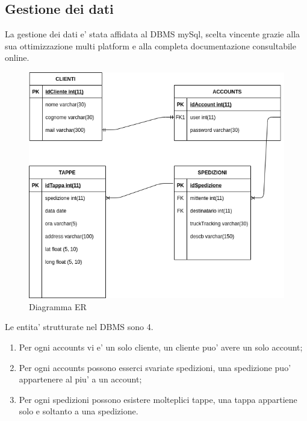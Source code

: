 \documentclass[a4paper, 12pt]{report}
\begin{document}
\subsection{Gestione dei dati}
La gestione dei dati e’ stata affidata al DBMS mySql, scelta vincente grazie alla sua ottimizzazione multi platform e alla completa documentazione consultabile online.
\begin{figure}[H]
    \centering
    \includegraphics[scale=0.5]{img/er.png}
    \caption{Diagramma ER}
    \label{fig:my_label}
\end{figure}
Le entita’ strutturate nel DBMS sono 4.
\begin{enumerate}
    \item Per  ogni accounts vi e’ un solo cliente, un cliente puo’ avere un solo account;
    \item Per ogni accounts possono esserci svariate spedizioni, una spedizione puo’ appartenere al piu’ a un account;
    \item Per ogni spedizioni possono esistere molteplici tappe, una tappa appartiene solo e soltanto a una spedizione.
\end{enumerate}
\end{document}
